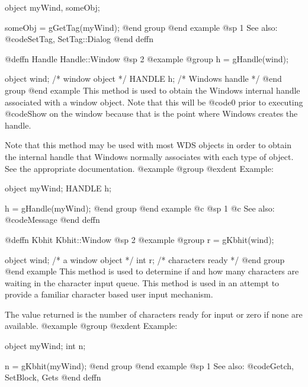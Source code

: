 object  myWind, someObj;

someObj = gGetTag(myWind);
@end group
@end example
@sp 1
See also:  @code{SetTag, SetTag::Dialog}
@end deffn












@deffn {Handle} Handle::Window
@sp 2
@example
@group
h = gHandle(wind);

object  wind;   /*  window object  */
HANDLE  h;      /*  Windows handle */
@end group
@end example
This method is used to obtain the Windows internal handle associated with
a window object.  Note that this will be @code{0} prior to executing
@code{Show} on the window because that is the point where Windows creates
the handle.

Note that this method may be used with most WDS objects in order to obtain
the internal handle that Windows normally associates with each type of object.
See the appropriate documentation.
@example
@group
@exdent Example:

object  myWind;
HANDLE  h;

h = gHandle(myWind);
@end group
@end example
@c @sp 1
@c See also:  @code{Message}
@end deffn






@deffn {Kbhit} Kbhit::Window
@sp 2
@example
@group
r = gKbhit(wind);

object  wind;   /*  a window object   */
int     r;      /*  characters ready  */
@end group
@end example
This method is used to determine if and how many characters are waiting
in the character input queue.  This method is used in an attempt to
provide a familiar character based user input mechanism.

The value returned is the number of characters ready for input or
zero if none are available.
@example
@group
@exdent Example:

object  myWind;
int     n;

n = gKbhit(myWind);
@end group
@end example
@sp 1
See also:  @code{Getch, SetBlock, Gets}
@end deffn



















